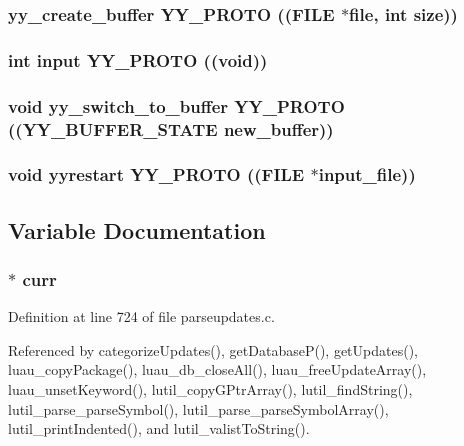 \subsubsection{ yy\_\-create\_\-buffer YY\_\-PROTO ((FILE $\ast${\bf file}, int {\bf size}))}\label{parseupdates_8c_a99}


\subsubsection{\setlength{\rightskip}{0pt plus 5cm}int input YY\_\-PROTO ((void))}\label{parseupdates_8c_a98}


\subsubsection{\setlength{\rightskip}{0pt plus 5cm}void yy\_\-switch\_\-to\_\-buffer YY\_\-PROTO (({\bf YY\_\-BUFFER\_\-STATE} new\_\-buffer))}\label{parseupdates_8c_a97}


\subsubsection{\setlength{\rightskip}{0pt plus 5cm}void yyrestart YY\_\-PROTO ((FILE $\ast$input\_\-file))}\label{parseupdates_8c_a96}




\subsection{Variable Documentation}
\subsubsection{$\ast$ {\bf curr}}\label{parseupdates_8c_a90}




Definition at line 724 of file parseupdates.c.

Referenced by categorize\-Updates(), get\-Database\-P(), get\-Updates(), luau\_\-copy\-Package(), luau\_\-db\_\-close\-All(), luau\_\-free\-Update\-Array(), luau\_\-unset\-Keyword(), lutil\_\-copy\-GPtr\-Array(), lutil\_\-find\-String(), lutil\_\-parse\_\-parse\-Symbol(), lutil\_\-parse\_\-parse\-Symbol\-Array(), lutil\_\-print\-Indented(), and lutil\_\-valist\-To\-String().
